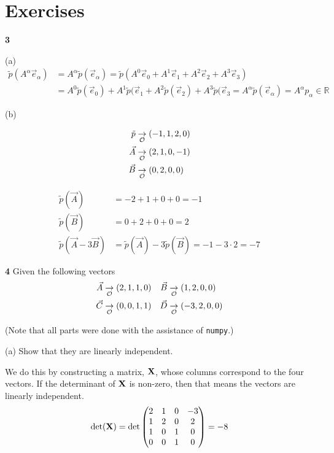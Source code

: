 \documentclass[gr-notes.tex]{subfiles}
\begin{document}
\setcounter{section}{9}

\section{Exercises}

\textbf{3}

(a)
\begin{align*}
  \tilde{p}(A^\alpha \vec{e}_\alpha) &=
  A^\alpha \tilde{p}(\vec{e}_\alpha) =
  \tilde{p}(A^0 \vec{e}_0 + A^1 \vec{e}_1 + A^2 \vec{e}_2 + A^3 \vec{e}_3)
  \\ &=
  A^0 \tilde{p}(\vec{e}_0) + A^1 \tilde{p}(\vec{e}_1 +
  A^2 \tilde{p}(\vec{e}_2) + A^3 \tilde{p}(\vec{e}_3 =
  A^\alpha \tilde{p}(\vec{e}_\alpha) = A^\alpha p_\alpha \in \mathbb{R}
\end{align*}

(b)

\begin{align*}
  \tilde{p} &\underset{\mathcal{O}}{\to} (-1, 1, 2, 0)
  \\
  \vec{A}   &\underset{\mathcal{O}}{\to} (2, 1, 0, -1)
  \\
  \vec{B}   &\underset{\mathcal{O}}{\to} (0, 2, 0, 0)
\end{align*}

\begin{align*}
  \tilde{p}(\vec{A}) &=
  -2 + 1 + 0 + 0 = -1
  \\
  \tilde{p}(\vec{B}) &=
  0 + 2 + 0 + 0 = 2
  \\
  \tilde{p}(\vec{A} - 3 \vec{B}) &=
  \tilde{p}(\vec{A}) - 3 \tilde{p}(\vec{B}) =
  -1 - 3 \cdot 2 = -7
\end{align*}

\textbf{4}
Given the following vectors
\begin{align*}
  \vec{A} & \underset{\mathcal{O}}{\to} ( 2, 1, 1, 0) &
  \vec{B} & \underset{\mathcal{O}}{\to} ( 1, 2, 0, 0) \\
  \vec{C} & \underset{\mathcal{O}}{\to} ( 0, 0, 1, 1) &
  \vec{D} & \underset{\mathcal{O}}{\to} (-3, 2, 0, 0)
\end{align*}

(Note that all parts were done with the assistance of \texttt{numpy}.)

(a) Show that they are linearly independent.

We do this by constructing a matrix, $\vb{X}$, whose columns correspond to the four vectors. If the determinant of $\vb{X}$ is non-zero, then that means the vectors are linearly independent.
%
\begin{displaymath}
  \det(\vb{X}) =
  \det \mqty(2 &  1 &  0 & -3 \\
             1 &  2 &  0 &  2 \\
             1 &  0 &  1 &  0 \\
             0 &  0 &  1 &  0) =
  -8
\end{displaymath}
\end{document}
